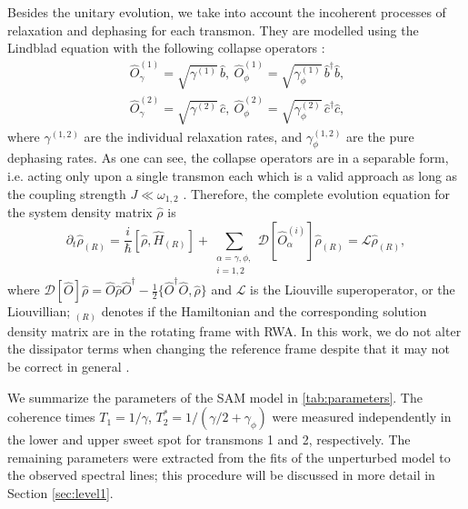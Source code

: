 \documentclass[%
 aps, prx,
 amsmath,amssymb,
 reprint,%
superscriptaddress
]{revtex4-2}
\begin{document}
Besides the unitary evolution, we take into 
account the incoherent processes of relaxation 
and dephasing for each transmon. They are 
modelled using the Lindblad equation with the 
following collapse 
operators \cite{bishop2010circuit}:
\begin{equation}\
\begin{split}
\hat{{O}}_{\gamma}^{(1)} = \sqrt{\gamma^{(1)}}\, \hat b,\ 
\hat{{O}}_{\phi}^{(1)} = \sqrt{\gamma_{\phi}^{(1)}}\, 
\hat b^\dag \hat b,\\
\hat{{O}}_{\gamma}^{(2)} = \sqrt{\gamma^{(2)}}\, \hat c,\ 
\hat{{O}}_{\phi}^{(2)} = \sqrt{\gamma_{ \phi}^{(2)}}\, 
\hat c^\dag \hat c,
\end{split}
\end{equation}
where $\gamma^{(1,2)}$ are the individual 
relaxation rates, and $\gamma_{\phi}^{(1,2)}$ are 
the pure dephasing rates. As one can see, the 
collapse operators are in a separable form, i.e. 
acting only upon a single transmon each which is 
a valid approach as long as the coupling strength $J \ll \omega_{1,2}$ 
 \cite{beaudoin2011dissipation}. 
Therefore, the complete evolution equation for 
the system density matrix $\hat \rho$ is		
\begin{equation}
\partial_t \hat \rho_{(R)} = \frac{i}{\hbar}[\hat 
\rho, \hat H_{(R)}] + \sum_{\substack{\alpha = {\gamma, \phi},\\ i=1,2}} 
\mathcal{D}[\hat{O}_{\alpha}^{(i)}] \hat \rho_{(R)} 
= \mathcal{L}\hat\rho_{(R)}, \label{eq:master}
\end{equation}
where $\mathcal{D}[\hat{{O}}]\hat \rho = 
\hat{{O}} \hat \rho \hat{{O}}^\dag - 
\frac{1}{2}\{ \hat{{O}}^\dag \hat{{O}}, \hat 
\rho\}$ and $\mathcal{L}$ is the Liouville 
superoperator, or the Liouvillian; $_{(R)}$ 
denotes if the Hamiltonian and the corresponding 
solution density matrix are in the rotating frame 
with RWA. In this work, we do not alter the 
dissipator terms when changing the reference 
frame despite that it may not be correct in 
general \cite{shavit2019bridging}.

We summarize the parameters of the SAM model in \autoref{tab:parameters}. The coherence times $T_1 = 1/\gamma$, $T_2^{*} = 1/(\gamma/2 + \gamma_{\phi})$ were measured independently in the lower and upper sweet spot for transmons 1 and 2, respectively. The remaining parameters were extracted from the fits of the unperturbed model to the observed spectral lines; this procedure will be discussed in more detail in Section \ref{sec:level1}.	
\end{document}
